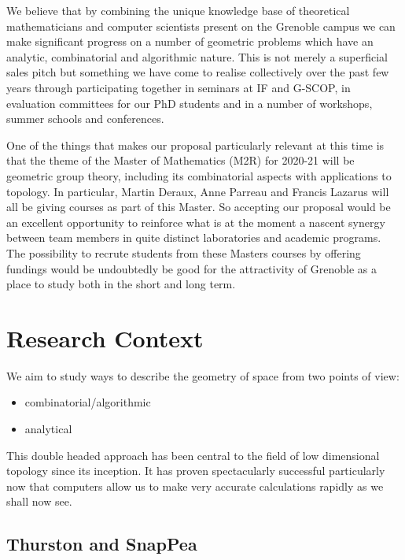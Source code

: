 \documentclass[14pt,fleqn]{article}
\begin{document}
We believe that by combining 
the unique knowledge base of theoretical
mathematicians and computer scientists
present on the Grenoble campus 
we can make significant progress 
on a number of geometric problems 
which have an analytic, combinatorial and algorithmic nature. 
This is not merely a superficial sales pitch 
but something we have come to realise collectively
over the past few years 
through participating together in seminars at IF and G-SCOP, in evaluation committees for our PhD students 
and in a number of workshops, summer schools and conferences.


One of the things that makes
our proposal particularly relevant
at this time is that
the theme of the  Master of
Mathematics (M2R) for 2020-21
will be  geometric group theory, 
including its combinatorial aspects with applications to topology. 
In particular, 
Martin Deraux, Anne Parreau and Francis Lazarus will all be giving courses as part of  this Master. 
So accepting our proposal 
would be  an excellent opportunity 
to reinforce
what is at the moment 
a nascent synergy 
between team members in
quite distinct laboratories and
academic programs. 
The possibility to recrute 
students from these Masters courses
by offering fundings 
would be undoubtedly 
be good for the attractivity
of Grenoble as a place to study
both in the short and long term. 


\section{Research Context}

We aim to study ways to describe the geometry of space from two points of view: 
\begin{itemize}
\item combinatorial/algorithmic
\item analytical
\end{itemize} 
This double headed approach has been central to the field of low dimensional topology since its inception.
It  has proven spectacularly successful 
particularly now that computers allow us 
to make very accurate calculations rapidly as we shall now see. 


\subsection{Thurston and SnapPea}
\end{document}

